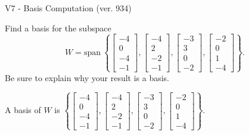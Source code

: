 \begin{exercise}
  \begin{exerciseTitle}V7 - Basis Computation (ver. 934)\end{exerciseTitle}
  \begin{exerciseStatement}
    Find a basis for the subspace 
\[W=\mathrm{span}\ \left\{\left[\begin{array}{r}
-4 \\
0 \\
-4 \\
-1
\end{array}\right] , \left[\begin{array}{r}
-4 \\
2 \\
-2 \\
-1
\end{array}\right] , \left[\begin{array}{r}
-3 \\
3 \\
0 \\
-2
\end{array}\right] , \left[\begin{array}{r}
-2 \\
0 \\
1 \\
-4
\end{array}\right]\right\}.\]
 Be sure to explain why your result is a basis.


  \end{exerciseStatement}
  \begin{exerciseAnswer}
   A basis of \(W\) is  \(\left\{\left[\begin{array}{r}
-4 \\
0 \\
-4 \\
-1
\end{array}\right] , \left[\begin{array}{r}
-4 \\
2 \\
-2 \\
-1
\end{array}\right] , \left[\begin{array}{r}
-3 \\
3 \\
0 \\
-2
\end{array}\right] , \left[\begin{array}{r}
-2 \\
0 \\
1 \\
-4
\end{array}\right]\right\}\).
  


  \end{exerciseAnswer}
\end{exercise}